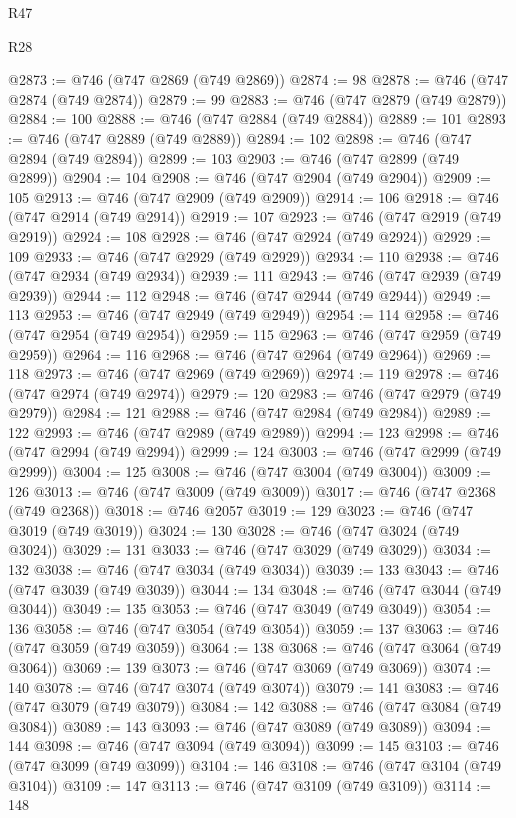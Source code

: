 \begin{lexlean}{R47}
\begin{lexlean}{R28}
\begin{coremodule}
{{{{{{{{{{{{{{{{{{{{{{{{{{{{{{{{{{{{{{{{{{{{{{{{{{{{{{{{{{{{{{{{{{{{{{{{{{{{{{{{{{{{{{{{{{{{{{{{{{{{{{{{{{{{{{{{{{{{{{{{{{{{{{{{{{{{{@2873 := @746 (@747 @2869 (@749 @2869))
@2874 := 98
@2878 := @746 (@747 @2874 (@749 @2874))
@2879 := 99
@2883 := @746 (@747 @2879 (@749 @2879))
@2884 := 100
@2888 := @746 (@747 @2884 (@749 @2884))
@2889 := 101
@2893 := @746 (@747 @2889 (@749 @2889))
@2894 := 102
@2898 := @746 (@747 @2894 (@749 @2894))
@2899 := 103
@2903 := @746 (@747 @2899 (@749 @2899))
@2904 := 104
@2908 := @746 (@747 @2904 (@749 @2904))
@2909 := 105
@2913 := @746 (@747 @2909 (@749 @2909))
@2914 := 106
@2918 := @746 (@747 @2914 (@749 @2914))
@2919 := 107
@2923 := @746 (@747 @2919 (@749 @2919))
@2924 := 108
@2928 := @746 (@747 @2924 (@749 @2924))
@2929 := 109
@2933 := @746 (@747 @2929 (@749 @2929))
@2934 := 110
@2938 := @746 (@747 @2934 (@749 @2934))
@2939 := 111
@2943 := @746 (@747 @2939 (@749 @2939))
@2944 := 112
@2948 := @746 (@747 @2944 (@749 @2944))
@2949 := 113
@2953 := @746 (@747 @2949 (@749 @2949))
@2954 := 114
@2958 := @746 (@747 @2954 (@749 @2954))
@2959 := 115
@2963 := @746 (@747 @2959 (@749 @2959))
@2964 := 116
@2968 := @746 (@747 @2964 (@749 @2964))
@2969 := 118
@2973 := @746 (@747 @2969 (@749 @2969))
@2974 := 119
@2978 := @746 (@747 @2974 (@749 @2974))
@2979 := 120
@2983 := @746 (@747 @2979 (@749 @2979))
@2984 := 121
@2988 := @746 (@747 @2984 (@749 @2984))
@2989 := 122
@2993 := @746 (@747 @2989 (@749 @2989))
@2994 := 123
@2998 := @746 (@747 @2994 (@749 @2994))
@2999 := 124
@3003 := @746 (@747 @2999 (@749 @2999))
@3004 := 125
@3008 := @746 (@747 @3004 (@749 @3004))
@3009 := 126
@3013 := @746 (@747 @3009 (@749 @3009))
@3017 := @746 (@747 @2368 (@749 @2368))
@3018 := @746 @2057
@3019 := 129
@3023 := @746 (@747 @3019 (@749 @3019))
@3024 := 130
@3028 := @746 (@747 @3024 (@749 @3024))
@3029 := 131
@3033 := @746 (@747 @3029 (@749 @3029))
@3034 := 132
@3038 := @746 (@747 @3034 (@749 @3034))
@3039 := 133
@3043 := @746 (@747 @3039 (@749 @3039))
@3044 := 134
@3048 := @746 (@747 @3044 (@749 @3044))
@3049 := 135
@3053 := @746 (@747 @3049 (@749 @3049))
@3054 := 136
@3058 := @746 (@747 @3054 (@749 @3054))
@3059 := 137
@3063 := @746 (@747 @3059 (@749 @3059))
@3064 := 138
@3068 := @746 (@747 @3064 (@749 @3064))
@3069 := 139
@3073 := @746 (@747 @3069 (@749 @3069))
@3074 := 140
@3078 := @746 (@747 @3074 (@749 @3074))
@3079 := 141
@3083 := @746 (@747 @3079 (@749 @3079))
@3084 := 142
@3088 := @746 (@747 @3084 (@749 @3084))
@3089 := 143
@3093 := @746 (@747 @3089 (@749 @3089))
@3094 := 144
@3098 := @746 (@747 @3094 (@749 @3094))
@3099 := 145
@3103 := @746 (@747 @3099 (@749 @3099))
@3104 := 146
@3108 := @746 (@747 @3104 (@749 @3104))
@3109 := 147
@3113 := @746 (@747 @3109 (@749 @3109))
@3114 := 148
}}}}}}}}}}}}}}}}}}}}}}}}}}}}}}}}}}}}}}}}}}}}}}}}}}}}}}}}}}}}}}}}}}}}}}}}}}}}}}}}}}}}}}}}}}}}}}}}}}}}}}}}}}}}}}}}}}}}}}}}}}}}}}}}}}}}}
\end{coremodule}
\end{lexlean}
\end{lexlean}
